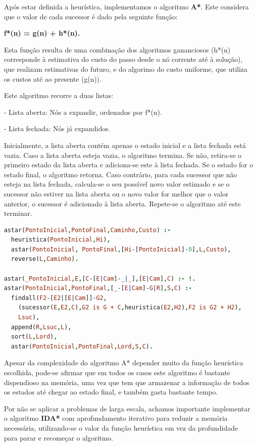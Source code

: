 \documentclass[a4paper]{article}
\begin{document}
Após estar definida a heurística, implementamos o algoritmo \textbf{A*}. Este considera que o valor de cada sucessor é dado pela seguinte função:

\centerline{\textbf{f*(n) = g(n) + h*(n).}}

Esta função resulta de uma combinação dos algoritmos gananciosos (h*(n) corresponde à estimativa do custo do passo desde o nó corrente até à solução), que realizam estimativas do futuro, e do algorimo do custo uniforme, que utiliza os custos até ao presente (g(n)).

Este algoritmo recorre a duas listas:

- Lista aberta: Nós a expandir, ordenados por f*(n).

- Lista fechada: Nós já expandidos.

Inicialmente, a lista aberta contém apenas o estado inicial e a lista fechada está vazia. Caso a lista aberta esteja vazia, o algoritmo termina. Se não, retira-se o primeiro estado da lista aberta e adiciona-se este à lista fechada. Se o estado for o estado final, o algoritmo retorna. Caso contrário, para cada sucessor que não esteja na lista fechada, calcula-se o seu possível novo valor estimado e se o sucessor não estiver na lista aberta ou o novo valor for melhor que o valor anterior, o sucessor é adicionado à lista aberta. Repete-se o algoritmo até este terminar.

\begin{lstlisting}[language=Prolog]
astar(PontoInicial,PontoFinal,Caminho,Custo) :-
  heuristica(PontoInicial,Hi),
  astar(PontoInicial, PontoFinal,[Hi-[PontoInicial]-0],L,Custo),
  reverse(L,Caminho).

astar(_PontoInicial,E,[C-[E|Cam]-_|_],[E|Cam],C) :- !.
astar(PontoInicial,PontoFinal,[_-[E|Cam]-G|R],S,C) :-
  findall(F2-[E2|[E|Cam]]-G2,
    (sucessor(E,E2,C),G2 is G + C,heuristica(E2,H2),F2 is G2 + H2),
    Lsuc),
  append(R,Lsuc,L),
  sort(L,Lord),
  astar(PontoInicial,PontoFinal,Lord,S,C).
\end{lstlisting}

Apesar da complexidade do algoritmo A* depender muito da função heurística escolhida, pode-se afirmar que em todos os casos este algoritmo é bastante dispendioso na memória, uma vez que tem que armazenar a informação de todos os estados até chegar ao estado final, e também gasta bastante tempo.

Por não se aplicar a problemas de larga escala, achamos importante implementar o algoritmo \textbf{IDA*} com aprofundamento iterativo para reduzir a memória necessária, utilizando-se o valor da função heurística em vez da profundidade para parar e recomeçar o algoritmo.
\end{document}
